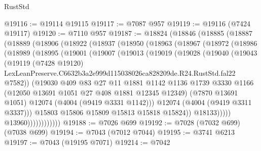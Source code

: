\begin{lexlean}{RustStd}
\begin{coremodule}
@19116 := @19114 @19115
@19117 := @7087 @957
@19119 := @19116 (@7424 @19117)
@19120 := @7110 @957
@19187 := @18824
    (@18846
      (@18885
        (@18887
          (@18889
            (@18906
              (@18922
                (@18937
                  (@18950
                    (@18963
                      (@18967
                        (@18972
                          (@18986
                            (@18989
                              (@18995
                                (@19001
                                  (@19007
                                    (@19013
                                      (@19019
                                        (@19028
                                          (@19040
                                            (@19043
                                              (@19119
                                                (@7428 @19120)
                                                LexLeanPreserve.C6632b3a2e999d115038026ca828209de.R24.RustStd.fal22
                                                @7582))
                                            (@19030
                                              @409
                                              @83
                                              @27
                                              @11
                                              @1881
                                              @1142
                                              @1136
                                              @1739
                                              @3330
                                              @1166
                                              (@12050 @13691 @1051 @27 @408 @1881 @12345 @12349)
                                              (@7870 @13691 @1051)
                                              @12074
                                              (@4004 (@9419 @3331 @1142)))
                                            @12074
                                            (@4004 (@9419 @3311 @3337)))
                                          @15803
                                          @15806
                                          @15809
                                          @15813
                                          @15818
                                          @15824))
                                      @18133)))))
                            @13960))))))))))))
@19188 := @7026 @699
@19192 := @7028 (@7032 @699) (@7038 @699)
@19194 := @7043 (@7012 @7044)
@19195 := @3741 @6213
@19197 := @7043 (@19195 @7071)
@19214 := @7042

\end{coremodule}
\end{lexlean}
